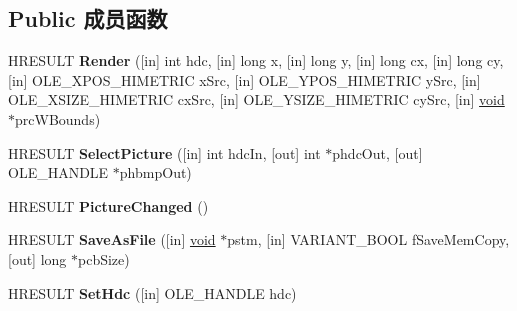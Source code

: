 \subsection*{Public 成员函数}
\begin{DoxyCompactItemize}
\item 
\mbox{\label{interfacestdole_1_1_i_picture_ac221b297a8be3f07bfe90c5b0227bd7d}} 
H\+R\+E\+S\+U\+LT {\bfseries Render} (\mbox{[}in\mbox{]} int hdc, \mbox{[}in\mbox{]} long x, \mbox{[}in\mbox{]} long y, \mbox{[}in\mbox{]} long cx, \mbox{[}in\mbox{]} long cy, \mbox{[}in\mbox{]} O\+L\+E\+\_\+\+X\+P\+O\+S\+\_\+\+H\+I\+M\+E\+T\+R\+IC x\+Src, \mbox{[}in\mbox{]} O\+L\+E\+\_\+\+Y\+P\+O\+S\+\_\+\+H\+I\+M\+E\+T\+R\+IC y\+Src, \mbox{[}in\mbox{]} O\+L\+E\+\_\+\+X\+S\+I\+Z\+E\+\_\+\+H\+I\+M\+E\+T\+R\+IC cx\+Src, \mbox{[}in\mbox{]} O\+L\+E\+\_\+\+Y\+S\+I\+Z\+E\+\_\+\+H\+I\+M\+E\+T\+R\+IC cy\+Src, \mbox{[}in\mbox{]} \hyperlink{interfacevoid}{void} $\ast$prc\+W\+Bounds)
\item 
\mbox{\label{interfacestdole_1_1_i_picture_aadab65a93593d5ac73653bdb4144a4be}} 
H\+R\+E\+S\+U\+LT {\bfseries Select\+Picture} (\mbox{[}in\mbox{]} int hdc\+In, \mbox{[}out\mbox{]} int $\ast$phdc\+Out, \mbox{[}out\mbox{]} O\+L\+E\+\_\+\+H\+A\+N\+D\+LE $\ast$phbmp\+Out)
\item 
\mbox{\label{interfacestdole_1_1_i_picture_a7b3b6aca7120b3c2f2ff1a7d8c265172}} 
H\+R\+E\+S\+U\+LT {\bfseries Picture\+Changed} ()
\item 
\mbox{\label{interfacestdole_1_1_i_picture_a67454e70dbb596be9265310be8cdb976}} 
H\+R\+E\+S\+U\+LT {\bfseries Save\+As\+File} (\mbox{[}in\mbox{]} \hyperlink{interfacevoid}{void} $\ast$pstm, \mbox{[}in\mbox{]} V\+A\+R\+I\+A\+N\+T\+\_\+\+B\+O\+OL f\+Save\+Mem\+Copy, \mbox{[}out\mbox{]} long $\ast$pcb\+Size)
\item 
\mbox{\label{interfacestdole_1_1_i_picture_a7261e0f5d6ede42f6c019335f9deb512}} 
H\+R\+E\+S\+U\+LT {\bfseries Set\+Hdc} (\mbox{[}in\mbox{]} O\+L\+E\+\_\+\+H\+A\+N\+D\+LE hdc)
\end{DoxyCompactItemize}
